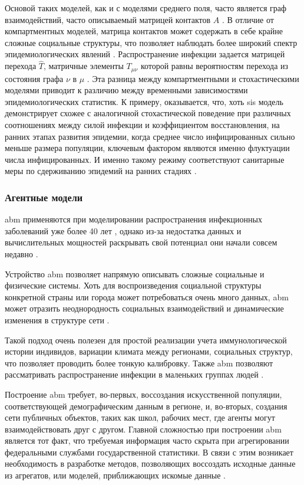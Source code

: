 \documentclass[a4paper,12pt]{article} %
\begin{document}
Основой таких моделей, как и с моделями среднего поля, часто является граф взаимодействий, часто описываемый матрицей контактов $A$ \cite{albert2002statistical}. В отличие от компартментных моделей, матрица контактов может содержать в себе крайне сложные социальные структуры, что позволяет наблюдать более широкий спектр эпидемиологических явлений \cite{pastor2015epidemic}. Распространение инфекции задается матрицей перехода $\hat{T}$, матричные элементы $T_{\mu\nu}$ которой равны вероятностям перехода из состояния графа $\nu$ в $\mu$ \cite{van1992stochastic}. Эта разница между компартментными и стохастическими моделями приводит к различию между временными зависимостями эпидемиологических статистик. К примеру, оказывается, что, хоть \gls{sis} модель демонстрирует схожее с аналогичной стохастической поведение при различных соотношениях между силой инфекции и коэффициентом восстановления, на ранних этапах развития эпидемии, когда среднее число инфицированных сильно меньше размера популяции, ключевым фактором являются именно флуктуации числа инфицированных. И именно такому режиму соответствуют санитарные меры по сдерживанию эпидемий на ранних стадиях \cite{nakamura2017efficient}.

\subsubsection{Агентные модели}
\gls{abm} применяются при моделировании распространения инфекционных заболеваний уже более 40 лет \cite{fox1971herd, elveback1976influmza}, однако из-за недостатка данных и вычислительных мощностей раскрывать свой потенциал они начали совсем недавно \cite{koopman2002controlling}.

Устройство \gls{abm} позволяет напрямую описывать сложные социальные и физические системы. Хоть для воспроизведения социальной структуры конкретной страны или города может потребоваться очень много данных, \gls{abm} может отразить неоднородность социальных взаимодействий и динамические изменения в структуре сети \cite{rakowski2010influenza}. 

Такой подход очень полезен для простой реализации учета иммунологической истории индивидов, вариации климата между регионами, социальных структур, что позволяет проводить более тонкую калибровку. Также \gls{abm} позволяют рассматривать распространение инфекции в маленьких группах людей \cite{rakowski2010influenza}.

Построение \gls{abm} требует, во-первых, воссоздания искусственной популяции, соответствующей демографическим данным в регионе, и, во-вторых, создания сети публичных объектов, таких как школ, рабочих мест, где агенты могут взаимодействовать друг с другом. Главной сложностью при построении \gls{abm} является тот факт, что требуемая информация часто скрыта при агрегировании федеральными службами государственной статистики. В связи с этим возникает необходимость в разработке методов, позволяющих воссоздать исходные данные из агрегатов, или моделей, приближающих искомые данные \cite{rakowski2010influenza}. 
\end{document}
